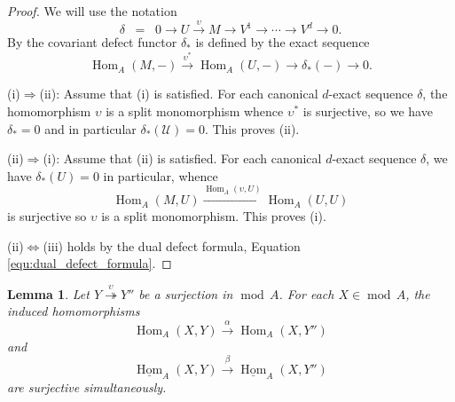 \documentclass[12pt,reqno]{amsart}
\def\cU{\mathscr{U}}
\def\Hom{\operatorname{Hom}}
\def\mod{\operatorname{mod}}
\numberwithin{equation}{section}
\newtheorem{Lemma}{Lemma}[section]
\theoremstyle{definition}
\theoremstyle{theorem}
\theoremstyle{definition}
\begin{document}
\begin{proof}
We will use the notation
\[
  \delta 
  \;\;=\;\; 0
  \xrightarrow{} U
  \xrightarrow{ \upsilon } M
  \xrightarrow{} V^1
  \xrightarrow{} \cdots
  \xrightarrow{} V^d
  \xrightarrow{} 0.
\]
By \cite[def.\ 3.1]{Jasso-Kvamme_Introduction-to_higher_AR-theory} the covariant defect functor $\delta_*$ is defined by the exact sequence
\[
  \Hom_A( M,- )
  \xrightarrow{ \upsilon^* }
  \Hom_A( U,- )
  \xrightarrow{}
  \delta_*( - )
  \xrightarrow{}
  0.
\]

(i)$\Rightarrow$(ii):  Assume that (i) is satisfied.  For each canonical $d$-exact sequence $\delta$, the homomorphism $\upsilon$ is a split monomorphism whence $\upsilon^*$ is surjective, so we have $\delta_* = 0$ and in particular $\delta_*( \cU ) = 0$.  This proves (ii).

(ii)$\Rightarrow$(i):  Assume that (ii) is satisfied.   For each canonical $d$-exact sequence $\delta$, we have $\delta_*( U ) = 0$ in particular, whence
\[
  \Hom_A( M,U )
  \xrightarrow{ \Hom_A( \upsilon,U ) }
  \Hom_A( U,U )
\]  
is surjective so $\upsilon$ is a split monomorphism.  This proves (i).

(ii)$\Leftrightarrow$(iii) holds by the dual defect formula, Equation \eqref{equ:dual_defect_formula}.
\end{proof}


\begin{Lemma}
\label{lem:surjective_simultaneously}
Let $Y \stackrel{ \upsilon }{ \twoheadrightarrow } Y''$ be a surjection in $\mod\,A$.  For each $X \in \mod\,A$, the induced homomorphisms
\[
  \Hom_A( X,Y ) \xrightarrow{ \alpha } \Hom_A( X,Y'' )
\]
and
\[
  \underline{ \Hom }_A( X,Y ) \xrightarrow{ \beta } \underline{ \Hom }_A( X,Y'' )
\]
are surjective simultaneously.
\end{Lemma}
\end{document}

